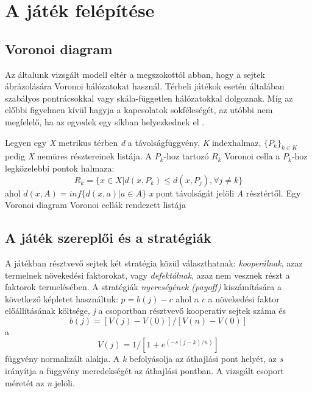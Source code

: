 \section{A játék felépítése}
\subsection{Voronoi diagram}
Az általunk vizsgált modell eltér a megszokottól abban, hogy a sejtek ábrázolására Voronoi hálózatokat használ. Térbeli játékok esetén általában szabályos pontrácsokkal vagy skála-független hálózatokkal dolgoznak. Míg az előbbi figyelmen kívül hagyja a kapcsolatok sokféleségét, az utóbbi nem megfelelő, ha az egyedek egy síkban helyezkednek el \cite{archetti2016cooperation}.

Legyen egy \textit{X} metrikus térben \textit{d} a távolságfüggvény, \textit{K} indexhalmaz, \(\{P_k\}_{k \in K}\) pedig \textit{X} nemüres résztereinek listája. A \(P_k\)-hoz tartozó \(R_k\) Voronoi cella a \(P_k\)-hoz legközelebbi pontok halmaza: 
\begin{equation}
R_k = \{x \in X | d(x,P_k) \leq d(x,P_j), \forall j \neq k\}
\end{equation}
ahol \(d(x,A) = inf\{d(x,a)|a \in A\}\) \textit{x} pont távolságát jelöli \textit{A} résztértől. Egy Voronoi diagram Voronoi cellák rendezett listája
  

\subsection{A játék szereplői és a stratégiák}
A játékban résztvevő sejtek két stratégia közül választhatnak: \textit{kooperálnak}, azaz termelnek növekedési faktorokat, vagy \textit{defektálnak}, azaz nem vesznek részt a faktorok termelésében. A stratégiák \textit{nyereségének (payoff)} kiszámítására a következő képletet használtuk: \(p = b(j) - c\) ahol a \textit{c} a növekedési faktor előállításának költsége, \textit{j} a csoportban résztvevő kooperatív sejtek száma és
\begin{equation}
b(j) = [V(j) - V(0)]/[V(n) - V(0)]
\end{equation}
a
\begin{equation} \label{eq:payoffGradient}
V(j) = 1/[1 + e^{(-s(j-k)/n)}]
\end{equation}
függvény normalizált alakja. A \textit{k} befolyásolja az áthajlási pont helyét, az \textit{s} irányítja a függvény meredekségét az áthajlási pontban. A vizsgált csoport méretét az \textit{n} jelöli. 

